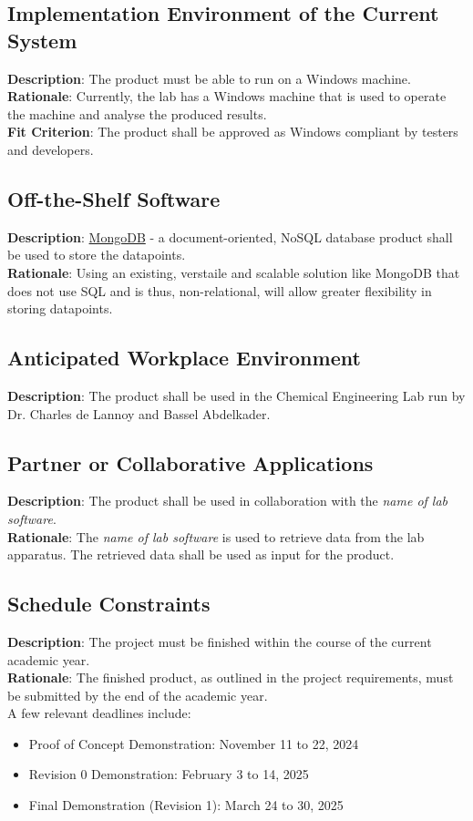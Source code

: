 \documentclass[12pt]{article}
\begin{document}
\subsection{Implementation Environment of the Current System}
\textbf{Description}: The product must be able to run on a Windows machine.\\
\textbf{Rationale}: Currently, the lab has a Windows machine that is used to operate the machine and analyse the produced results.\\
\textbf{Fit Criterion}: The product shall be approved as Windows compliant by testers and developers.

\subsection{Off-the-Shelf Software}
\textbf{Description}: \href{https://www.mongodb.com/}{MongoDB} - a document-oriented, NoSQL database product shall be used to store the datapoints.\\
\textbf{Rationale}: Using an existing, verstaile and scalable solution like MongoDB that does not use SQL and is thus, non-relational, will allow greater flexibility in storing datapoints.\\

\subsection{Anticipated Workplace Environment}
\textbf{Description}: The product shall be used in the Chemical Engineering Lab run by Dr. Charles de Lannoy and Bassel Abdelkader.

\subsection{Partner or Collaborative Applications}
\textbf{Description}: The product shall be used in collaboration with the \emph{name of lab software}.\\
\textbf{Rationale}: The \emph{name of lab software} is used to retrieve data from the lab apparatus. The retrieved data shall be used as input for the product.

\subsection{Schedule Constraints}
\textbf{Description}: The project must be finished within the course of the current academic year.\\
\textbf{Rationale}: The finished product, as outlined in the project requirements, must be submitted by the end of the academic year.\\
\newline
A few relevant deadlines include:
\begin{itemize}
  \item Proof of Concept Demonstration: November 11 to 22, 2024
  \item Revision 0 Demonstration: February 3 to 14, 2025
  \item Final Demonstration (Revision 1): March 24 to 30, 2025
\end{itemize}
\end{document}
